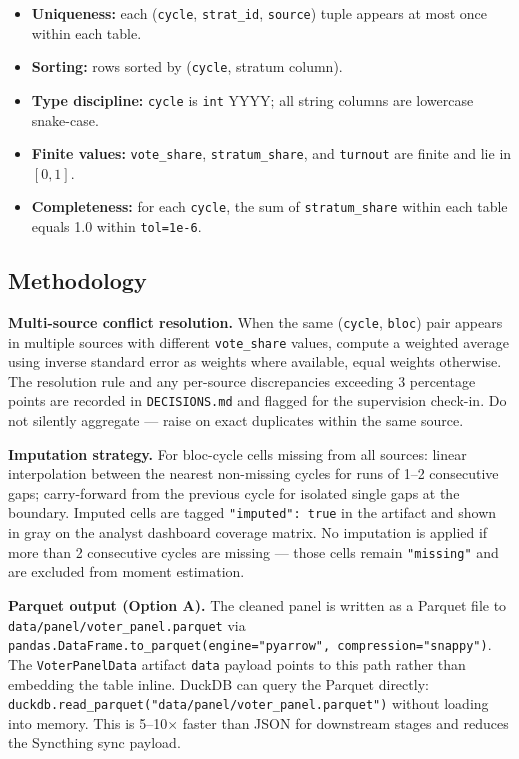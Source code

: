 \documentclass[11pt]{article}
\begin{document}
\begin{itemize}[leftmargin=1.6em, itemsep=2pt]
  \item \textbf{Uniqueness:} each (\texttt{cycle}, \texttt{strat\_id},
        \texttt{source}) tuple appears at most once within each table.
  \item \textbf{Sorting:} rows sorted by (\texttt{cycle}, stratum column).
  \item \textbf{Type discipline:} \texttt{cycle} is \texttt{int} YYYY; all
        string columns are lowercase snake-case.
  \item \textbf{Finite values:} \texttt{vote\_share}, \texttt{stratum\_share},
        and \texttt{turnout} are finite and lie in $[0, 1]$.
  \item \textbf{Completeness:} for each \texttt{cycle}, the sum of
        \texttt{stratum\_share} within each table equals 1.0 within
        \texttt{tol=1e-6}.
\end{itemize}

\subsection*{Methodology}

\textbf{Multi-source conflict resolution.}
When the same (\texttt{cycle}, \texttt{bloc}) pair appears in multiple sources
with different \texttt{vote\_share} values, compute a weighted average using
inverse standard error as weights where available, equal weights otherwise.
The resolution rule and any per-source discrepancies exceeding 3 percentage
points are recorded in \texttt{DECISIONS.md} and flagged for the supervision
check-in. Do not silently aggregate --- raise on exact duplicates within the
same source.

\textbf{Imputation strategy.}
For bloc-cycle cells missing from all sources: linear interpolation between
the nearest non-missing cycles for runs of 1--2 consecutive gaps; carry-forward
from the previous cycle for isolated single gaps at the boundary. Imputed cells
are tagged \texttt{"imputed": true} in the artifact and shown in gray on the
analyst dashboard coverage matrix. No imputation is applied if more than 2
consecutive cycles are missing --- those cells remain \texttt{"missing"} and
are excluded from moment estimation.

\textbf{Parquet output (Option A).}
The cleaned panel is written as a Parquet file to
\texttt{data/panel/voter\_panel.parquet} via
\texttt{pandas.DataFrame.to\_parquet(engine="pyarrow", compression="snappy")}.
The \texttt{VoterPanelData} artifact \texttt{data} payload points to this
path rather than embedding the table inline. DuckDB can query the Parquet
directly: \texttt{duckdb.read\_parquet("data/panel/voter\_panel.parquet")}
without loading into memory. This is 5--10$\times$ faster than JSON for
downstream stages and reduces the Syncthing sync payload.
\end{document}
